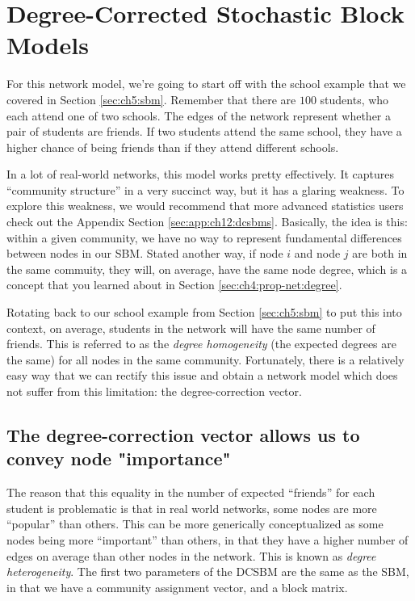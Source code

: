 \section{Degree-Corrected Stochastic Block Models}
\label{sec:ch5:dcsbm}


For this network model, we're going to start off with the school example that we covered in Section \ref{sec:ch5:sbm}. Remember that there are $100$ students, who each attend one of two schools. The edges of the network represent whether a pair of students are friends. If two students attend the same school, they have a higher chance of being friends than if they attend different schools. 

In a lot of real-world networks, this model works pretty effectively. It captures ``community structure'' in a very succinct way, but it has a glaring weakness. To explore this weakness, we would recommend that more advanced statistics users check out the Appendix Section \ref{sec:app:ch12:dcsbms}. Basically, the idea is this: within a given community, we have {no way} to represent fundamental differences between nodes in our SBM. Stated another way, if node $i$ and node $j$ are both in the same commuity, they will, on average, have the same {node degree}, which is a concept that you learned about in Section \ref{sec:ch4:prop-net:degree}. 

Rotating back to our school example from Section \ref{sec:ch5:sbm} to put this into context, on average, students in the network will have the same number of friends. This is referred to as the \textit{degree homogeneity} (the expected degrees are the same) for all nodes in the same community. Fortunately, there is a relatively easy way that we can rectify this issue and obtain a network model which does not suffer from this limitation: the degree-correction vector.

\subsection{The degree-correction vector allows us to convey node "importance"}

The reason that this equality in the number of expected ``friends'' for each student is problematic is that in real world networks, some nodes are more ``popular'' than others. This can be more generically conceptualized as some nodes being more ``important'' than others, in that they have a higher number of edges on average than other nodes in the network. This is known as \textit{degree heterogeneity}. The first two parameters of the DCSBM are the same as the SBM, in that we have a community assignment vector, and a block matrix.

